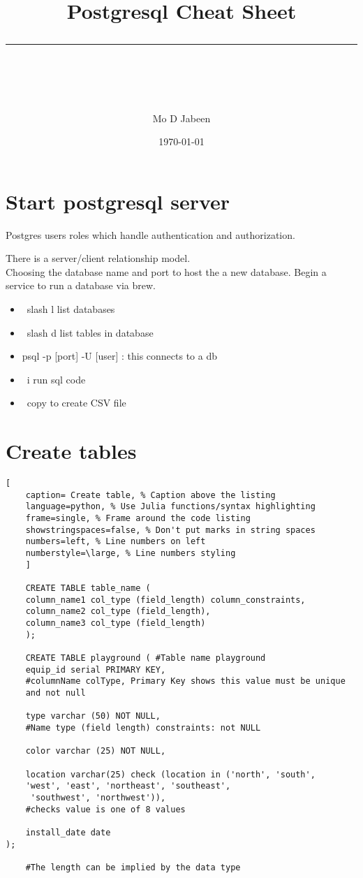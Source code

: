 \documentclass[11pt]{scrartcl} %
\title{	
	\normalfont\normalsize
	\vspace{20pt} %
	{\huge Postgresql Cheat Sheet}\\ %
	\vspace{12pt} %
	\rule{\linewidth}{2pt}\\ %
}
\author{\small Mo D Jabeen} %
\date{\normalsize\today} %
\begin{document}
\maketitle %

\section{Start postgresql server}

Postgres users roles which handle authentication and authorization.

There is a server/client relationship model.\\

Choosing the database name and port to host the a new database. Begin a service to run
a database via brew.

\begin{itemize}
	\item \ slash l list databases
	\item \ slash d list tables in database
	\item psql -p [port] -U [user] : this connects to a db
	\item \ i run sql code
	\item \ copy to create CSV file
\end{itemize}

\section{Create tables}

\begin{lstlisting}[
	caption= Create table, % Caption above the listing
	language=python, % Use Julia functions/syntax highlighting
	frame=single, % Frame around the code listing
	showstringspaces=false, % Don't put marks in string spaces
	numbers=left, % Line numbers on left
	numberstyle=\large, % Line numbers styling
	]

	CREATE TABLE table_name (
    column_name1 col_type (field_length) column_constraints,
    column_name2 col_type (field_length),
    column_name3 col_type (field_length)
	);

	CREATE TABLE playground ( #Table name playground
    equip_id serial PRIMARY KEY, 
	#columnName colType, Primary Key shows this value must be unique
	and not null
    
	type varchar (50) NOT NULL, 
	#Name type (field length) constraints: not NULL
 
	color varchar (25) NOT NULL,
 
	location varchar(25) check (location in ('north', 'south', 
	'west', 'east', 'northeast', 'southeast',
	 'southwest', 'northwest')),
	#checks value is one of 8 values
 
	install_date date
);

	#The length can be implied by the data type

\end{lstlisting}
\end{document}
